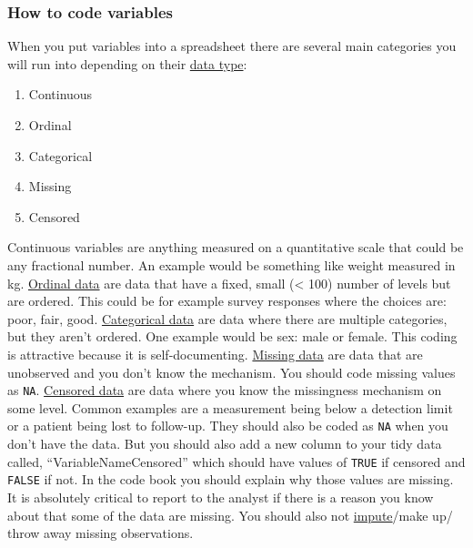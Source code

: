 \documentclass[
]{article}
\providecommand{\tightlist}{%
  \setlength{\itemsep}{0pt}\setlength{\parskip}{0pt}}
\begin{document}
\hypertarget{how-to-code-variables}{%
\subsubsection{How to code variables}\label{how-to-code-variables}}

When you put variables into a spreadsheet there are several main
categories you will run into depending on their
\href{http://en.wikipedia.org/wiki/Statistical_data_type}{data type}:

\begin{enumerate}
\def\labelenumi{\arabic{enumi}.}
\tightlist
\item
  Continuous
\item
  Ordinal
\item
  Categorical
\item
  Missing
\item
  Censored
\end{enumerate}

Continuous variables are anything measured on a quantitative scale that
could be any fractional number. An example would be something like
weight measured in kg.
\href{http://en.wikipedia.org/wiki/Ordinal_data}{Ordinal data} are data
that have a fixed, small (\textless{} 100) number of levels but are
ordered. This could be for example survey responses where the choices
are: poor, fair, good.
\href{http://en.wikipedia.org/wiki/Categorical_variable}{Categorical
data} are data where there are multiple categories, but they aren't
ordered. One example would be sex: male or female. This coding is
attractive because it is self-documenting.
\href{http://en.wikipedia.org/wiki/Missing_data}{Missing data} are data
that are unobserved and you don't know the mechanism. You should code
missing values as \texttt{NA}.
\href{http://en.wikipedia.org/wiki/Censoring_(statistics)}{Censored
data} are data where you know the missingness mechanism on some level.
Common examples are a measurement being below a detection limit or a
patient being lost to follow-up. They should also be coded as
\texttt{NA} when you don't have the data. But you should also add a new
column to your tidy data called, ``VariableNameCensored'' which should
have values of \texttt{TRUE} if censored and \texttt{FALSE} if not. In
the code book you should explain why those values are missing. It is
absolutely critical to report to the analyst if there is a reason you
know about that some of the data are missing. You should also not
\href{http://en.wikipedia.org/wiki/Imputation_(statistics)}{impute}/make
up/ throw away missing observations.
\end{document}
